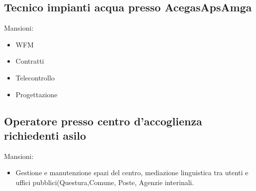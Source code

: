 \documentclass[12pt,a4paper,sans]{moderncv} %
\begin{document}
\subsection{Tecnico impianti acqua presso AcegasApsAmga}
Mansioni:
\begin{itemize}
\item WFM
\item Contratti
\item Telecontrollo
\item Progettazione

\end{itemize}

\subsection{Operatore presso centro d'accoglienza richiedenti asilo}

Mansioni:
\begin{itemize}
\item Gestione e manutenzione spazi del centro, mediazione linguistica tra utenti e uffici pubblici(Questura,Comune, Poste, Agenzie interinali.
\end{itemize}
\end{document}
